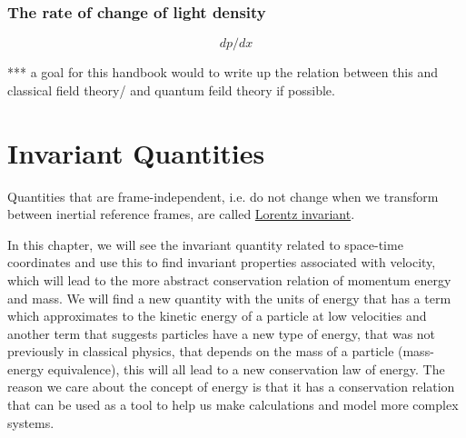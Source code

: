 


\subsection{The rate of change of light density}\label{subsect: The rate of change or potential}

\begin{equation}
	dp/dx
\end{equation}

*** a goal for this handbook would to write up the relation between this and classical field theory/ and quantum feild theory if possible.

\chapter{Invariant Quantities} \label{ch: Invariant Quantities}

Quantities that are frame-independent, i.e.
do not change when we transform between inertial reference frames, are called \hyperlink{def-lorentz-invariant}{Lorentz invariant}.

In this chapter, we will see the invariant quantity related to space-time coordinates and use this to find invariant properties associated with velocity, which will lead to the more abstract conservation relation of momentum energy and mass.
We will find a new quantity with the units of energy that has a term which approximates to the kinetic energy of a particle at low velocities and another term that suggests particles have a new type of energy, that was not previously in classical physics, that depends on the mass of a particle (mass-energy equivalence), this will all lead to a new conservation law of energy.
The reason we care about the concept of energy is that it has a conservation relation that can be used as a tool to help us make calculations and model more complex systems.

